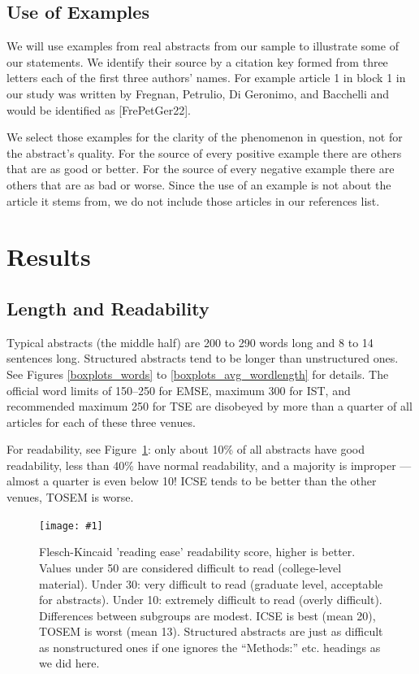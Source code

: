 \documentclass[10pt,journal,compsoc]{IEEEtran}
\newcommand{\ifarxiv}[1]{#1}  %
\newcommand{\Plot}[2]{%
	\begin{figure}[htb]%
		\centering\texttt{[image: \#1]}%
		\vspace{-4mm}\caption{#2}\label{#1}%
	\end{figure}}
\newcommand{\Art}[1]{\bgroup[#1]\egroup} %
\begin{document}
\subsection{Use of Examples}

We will use examples from real abstracts from our sample to illustrate
some of our statements.
We identify their source by a citation key
formed from three letters each of the first three authors' names.
For example article 1 in block 1 in our study was written by
Fregnan, Petrulio, Di Geronimo, and Bacchelli
and would be identified as \Art{FrePetGer22}.

We select those examples for the clarity of the phenomenon in question,
not for the abstract's quality.
For the source of every positive example there are others that are
as good or better.
For the source of every negative example there are others that are
as bad or worse.
Since the use of an example is not about the article it stems from,
we do not include those articles in our references list.

\section{Results}

\subsection{Length and Readability}

Typical abstracts (the middle half) are 200 to 290 words long
and 8 to 14 sentences long.
Structured abstracts tend to be longer than unstructured ones.
\ifarxiv{See Figures \ref{boxplots_words} to \ref{boxplots_avg_wordlength} for details.}
The official word limits of
150--250 for EMSE,
maximum 300 for IST, and
recommended maximum 250 for TSE
are disobeyed by more than a quarter of all articles for each of these three venues.

For readability, see Figure~\ref{boxplots_fkscore}:
only about 10\% of all abstracts have good readability,
less than 40\% have normal readability,
and a majority is improper --- almost a quarter is even below 10!
ICSE tends to be better than the other venues,
TOSEM is worse.

\Plot{boxplots_fkscore}{%
	Flesch-Kincaid 'reading ease' readability score, higher is better.
    Values under 50 are considered difficult to read (college-level material).
    Under 30: very difficult to read (graduate level, acceptable for abstracts).
	Under 10: extremely difficult to read (overly difficult).
    Differences between subgroups are modest.
	ICSE is best (mean 20), TOSEM is worst (mean 13).
    Structured abstracts are just as difficult as nonstructured ones
    if one ignores the ``Methods:'' etc. headings as we did here.
}
\end{document}
